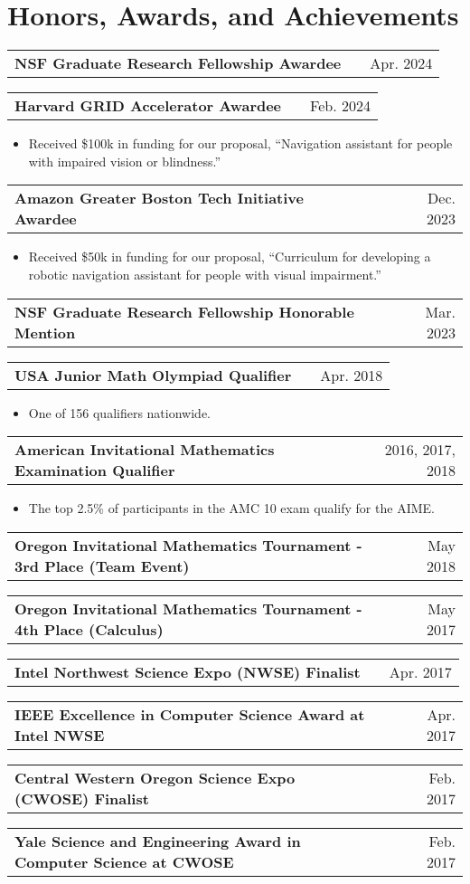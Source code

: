 \documentclass[a4paper,12pt]{article}
\makeatletter
\newenvironment{jobshort}[2]
    {
    \begin{tabularx}{\linewidth}{@{}l X r@{}}
    \textbf{#1} & \hfill &  #2 \\[3.75pt]
    \end{tabularx}
    }
    {
    }
\newenvironment{joblong}[2]
    {
    \begin{tabularx}{\linewidth}{@{}l X r@{}}
    \textbf{#1} & \hfill &  #2 \\[3.75pt]
    \end{tabularx}
    \begin{minipage}[t]{\linewidth}
    \begin{itemize}[nosep,after=\strut, leftmargin=2em, itemsep=3pt,label=--]
    }
    {
    \end{itemize}
    \end{minipage}    
    }
\makeatother
\begin{document}
\section{Honors, Awards, and Achievements}
\begin{adjustwidth}{0.7em}{0pt}

\begin{jobshort}{NSF Graduate Research Fellowship Awardee}{Apr. 2024}
\end{jobshort}
\begin{joblong}{Harvard GRID Accelerator Awardee}{Feb. 2024}
    \item Received \$100k in funding for our proposal, “Navigation assistant for people with impaired vision or blindness.” 
\end{joblong}
\begin{joblong}{Amazon Greater Boston Tech Initiative Awardee}{Dec. 2023}
    \item Received \$50k in funding for our proposal, “Curriculum for developing a robotic navigation assistant for people with visual impairment.” 
\end{joblong}
\begin{jobshort}{NSF Graduate Research Fellowship Honorable Mention}{Mar. 2023}
\end{jobshort}
\begin{joblong}{USA Junior Math Olympiad Qualifier}{Apr. 2018}
    \item One of 156 qualifiers nationwide.
\end{joblong}
\begin{joblong}{American Invitational Mathematics Examination Qualifier}{2016, 2017, 2018}
    \item The top 2.5\% of participants in the AMC 10 exam qualify for the AIME.
\end{joblong}
\begin{jobshort}{Oregon Invitational Mathematics Tournament - 3rd Place (Team Event)}{May 2018}
\end{jobshort}
\begin{jobshort}{Oregon Invitational Mathematics Tournament - 4th Place (Calculus)}{May 2017}
\end{jobshort}
\begin{jobshort}{Intel Northwest Science Expo (NWSE) Finalist}{Apr. 2017}
\end{jobshort}
\begin{jobshort}{IEEE Excellence in Computer Science Award at Intel NWSE}{Apr. 2017}
\end{jobshort}
\begin{jobshort}{Central Western Oregon Science Expo (CWOSE) Finalist}{Feb. 2017}
\end{jobshort}
\begin{jobshort}{Yale Science and Engineering Award in Computer Science at CWOSE}{Feb. 2017}
\end{jobshort}
\end{adjustwidth}
\end{document}
